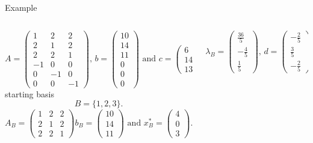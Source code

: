 \begin{frame}{Example} \scriptsize 

  \begin{columns}[t]
    \begin{column}{.5\textwidth}

 
  \begin{displaymath}
    A  =\begin{pmatrix}1 & 2 & 2\\2 & 1 & 2\\2 & 2 & 1\\-1 & 0 & 0\\0 & -1 & 0\\0 & 0 & -1\end{pmatrix}, \, b = 
    \begin{pmatrix}10\\14\\11\\0\\0\\0\end{pmatrix} \text{ and } c =
    \begin{pmatrix}
      6\\14\\13
    \end{pmatrix}
  \end{displaymath}
   starting basis
  \begin{displaymath}
    B = \{1,2,3\}. 
  \end{displaymath}
       \begin{displaymath}
    A_B = \begin{pmatrix}1 & 2 & 2\\2 & 1 & 2\\2 & 2 & 1\end{pmatrix} b_B = \begin{pmatrix}10\\14\\11\end{pmatrix} \text{ and } x^*_B = \begin{pmatrix}4\\0\\3\end{pmatrix}. 
  \end{displaymath} 
    \end{column}
    \begin{column}{.5\textwidth}

  \begin{displaymath}
    λ_B = \begin{pmatrix}\frac{36}{5}\\- \frac{4}{5}\\\frac{1}{5}\end{pmatrix}, \,  
     d = \begin{pmatrix}- \frac{2}{5}\\\frac{3}{5}\\- \frac{2}{5}\end{pmatrix}. 
   \end{displaymath}      



\end{column}
\end{columns}
\end{frame}
